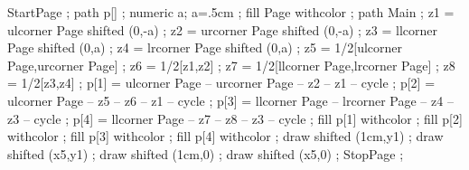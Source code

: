 


\definecolor [b]                [s=.9]
\definecolor [c] 	        [s=0]
\definecolor [a]                [r=.2, g=.2, b=.72]
\definecolor [Item]             [r=.2, g=.2, b=.75]


StartPage ;
path p[] ;
numeric a; a=.5cm ;
fill Page withcolor  ;
path Main ;
z1 = ulcorner Page shifted (0,-a) ;
z2 = urcorner Page shifted (0,-a) ;
z3 = llcorner Page shifted (0,a) ;
z4 = lrcorner Page shifted (0,a) ;
z5 = 1/2[ulcorner Page,urcorner Page] ;
z6 = 1/2[z1,z2] ;
z7 = 1/2[llcorner Page,lrcorner Page] ;
z8 = 1/2[z3,z4] ;
p[1] = ulcorner Page -- urcorner Page -- z2 -- z1 -- cycle ;
p[2] = ulcorner Page -- z5 -- z6 -- z1 -- cycle ;
p[3] = llcorner Page -- lrcorner Page -- z4 -- z3 -- cycle ;
p[4] = llcorner Page -- z7 -- z8 -- z3 -- cycle ;
fill p[1] withcolor  ;
fill p[2] withcolor  ;
fill p[3] withcolor  ;
fill p[4] withcolor  ;
draw \sometxt{\framed[frame=off,offset=0pt,width=.5\textwidth,height=.5cm,align=left,top=\vss,bottom=\vss,strut=no]{\ix\color[b]{\currentdate \quad}}} shifted (1cm,y1) ;
draw \sometxt{\framed[frame=off,offset=0pt,width=.5\textwidth,height=.5cm,align=right,top=\vss,bottom=\vss,strut=no]{\ix\color[b]{\quad \folio\ of \lastpage}}} shifted (x5,y1) ;
draw  shifted (1cm,0) ;
draw  shifted (x5,0) ;
StopPage ;
\stopuseMPgraphic 


